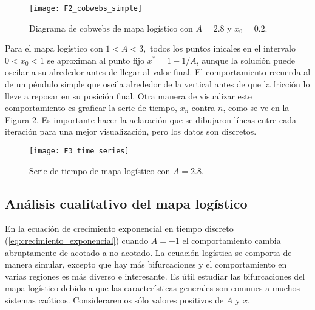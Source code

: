             \begin{figure}[hbtp]
                \centering
                \texttt{[image: F2\_cobwebs\_simple]}
                \caption{Diagrama de cobwebs de mapa logístico con $A = 2.8$ y $x_{0} = 0.2$.}
                \label{fig:F2_cobwebs_simple}
            \end{figure}

            Para el mapa logístico con $1 < A < 3,$ todos los puntos inicales en el intervalo $0 < x_{0} < 1$ se aproximan al punto fijo $x^{*} = 1 - 1/ A $, aunque la solución puede oscilar a su alrededor antes de llegar al valor final. El comportamiento recuerda al de un péndulo simple que oscila alrededor de la vertical antes de que la fricción lo lleve a reposar en su posición final. Otra manera de visualizar este comportamiento es graficar la serie de tiempo, $x_{n}$ contra $n$, como se ve en la Figura \ref{fig:F3_time_series}. Es importante hacer la aclaración que se dibujaron líneas entre cada iteración para una mejor visualización, pero los datos son discretos. 

            \begin{figure}[hbtp]
                \centering
                \texttt{[image: F3\_time\_series]}
                \caption{Serie de tiempo de mapa logístico con $A = 2.8$.}
                \label{fig:F3_time_series}
            \end{figure}

        \subsection{Análisis cualitativo del mapa logístico }

            En la ecuación de crecimiento exponencial en tiempo discreto (\ref{eq:crecimiento_exponencial}) cuando $A = \pm 1$ el comportamiento cambia abruptamente de acotado a no acotado. La ecuación logística se comporta de manera simular, excepto que hay más bifurcaciones y el comportamiento en varias regiones es más diverso e interesante. Es útil estudiar las bifurcaciones del mapa logístico debido a que las características generales son comunes a muchos sistemas caóticos. Consideraremos sólo valores positivos de $A$ y $x$.

